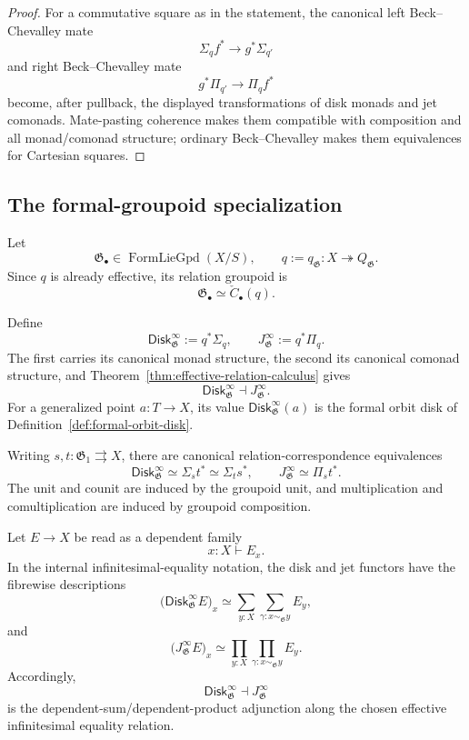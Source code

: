 \begin{proof}
For a commutative square as in the statement, the canonical left
Beck--Chevalley mate
\[
    \Sigma_q f^*\longrightarrow g^*\Sigma_{q'}
\]
and right Beck--Chevalley mate
\[
    g^*\Pi_{q'}\longrightarrow\Pi_q f^*
\]
become, after pullback, the displayed transformations of disk monads and jet
comonads.  Mate-pasting coherence makes them compatible with composition and
all monad/comonad structure; ordinary Beck--Chevalley makes them equivalences
for Cartesian squares.
\end{proof}


\subsection{The formal-groupoid specialization}

Let
\[
    \mathfrak G_\bullet\in\operatorname{FormLieGpd}(X/S),
    \qquad
    q:=q_{\mathfrak G}:X\twoheadrightarrow Q_{\mathfrak G}.
\]
Since $q$ is already effective, its relation groupoid is
\[
    \mathfrak G_\bullet\simeq\check C_\bullet(q).
\]

\begin{definition}
\label{def:formal-groupoid-disk-jet}
Define
\[
    \mathsf{Disk}^{\infty}_{\mathfrak G}:=q^*\Sigma_q,
    \qquad
    J^\infty_{\mathfrak G}:=q^*\Pi_q.
\]
The first carries its canonical monad structure, the second its canonical
comonad structure, and Theorem~\ref{thm:effective-relation-calculus} gives
\[
    \mathsf{Disk}^{\infty}_{\mathfrak G}\dashv J^\infty_{\mathfrak G}.
\]
For a generalized point \(a:T\to X\), its value
\(\mathsf{Disk}^{\infty}_{\mathfrak G}(a)\) is the formal orbit disk of
Definition~\ref{def:formal-orbit-disk}.
\end{definition}

Writing $s,t:\mathfrak G_1\rightrightarrows X$, there are canonical
relation-correspondence equivalences
\[
    \mathsf{Disk}^{\infty}_{\mathfrak G}\simeq\Sigma_s t^*
    \simeq\Sigma_t s^*,
    \qquad
    J^\infty_{\mathfrak G}\simeq\Pi_s t^*.
\]
The unit and counit are induced by the groupoid unit, and multiplication and
comultiplication are induced by groupoid composition.


\begin{proposition}
\label{prop:formal-groupoid-dependent-sum-product}
Let $E\to X$ be read as a dependent family
\[
    x:X\vdash E_x.
\]
In the internal infinitesimal-equality notation, the disk and jet functors have
the fibrewise descriptions
\[
\boxed{
    \bigl(\mathsf{Disk}^{\infty}_{\mathfrak G}E\bigr)_x
    \simeq
    \sum_{y:X}
    \sum_{\gamma:x\sim_{\mathfrak G}y}
    E_y
},
\]
and
\[
\boxed{
    \bigl(J^\infty_{\mathfrak G}E\bigr)_x
    \simeq
    \prod_{y:X}
    \prod_{\gamma:x\sim_{\mathfrak G}y}
    E_y
}.
\]
Accordingly,
\[
    \mathsf{Disk}^{\infty}_{\mathfrak G}\dashv J^\infty_{\mathfrak G}
\]
is the dependent-sum/dependent-product adjunction along the chosen effective
infinitesimal equality relation.
\end{proposition}

